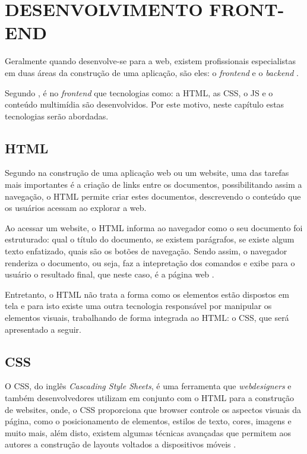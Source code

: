 \section{DESENVOLVIMENTO FRONT-END}

Geralmente quando desenvolve-se para a web, existem profissionais especialistas
em duas áreas da construção de uma aplicação, são eles: o \textit{frontend} e o
\textit{backend} \cite{artigoAvaliacaoEReducaoDoTempoDeRespostaDeSistemasWeb}.

Segundo , é no
\textit{frontend} que tecnologias como: a \ac{HTML}, as \ac{CSS}, o \ac{JS}
e o conteúdo multimídia são desenvolvidos. Por este motivo, neste capítulo estas
tecnologias serão abordadas.

\subsection{HTML}

Segundo  na construção de uma aplicação web ou
um website, uma das tarefas mais importantes é a criação de links entre os
documentos, possibilitando assim a navegação, o \acs{HTML} permite criar
estes documentos, descrevendo o conteúdo que os usuários acessam ao explorar a
web.

Ao acessar um website, o \acs{HTML} informa ao navegador como o seu documento
foi estruturado: qual o título do documento, se existem parágrafos, se existe
algum texto enfatizado, quais são os botões de navegação. Sendo assim, o
navegador renderiza o documento, ou seja, faz a intepretação dos
comandos e exibe para o usuário o resultado final, que neste caso, é a página
web \cite{headFirstHTMLWithCSSAndXHTML}.

Entretanto, o \acs{HTML} não trata a forma como os elementos estão dispostos em
tela e para isto existe uma outra tecnologia responsável por manipular os
elementos visuais, trabalhando de forma integrada ao \acs{HTML}:
o \acs{CSS}, que será apresentado a seguir.

\subsection{CSS}

O \ac{CSS}, do inglês \textit{Cascading Style Sheets}, é uma ferramenta
que \textit{webdesigners} e também desenvolvedores utilizam em conjunto com o
\ac{HTML} para a construção de websites, onde, o \acs{CSS} proporciona que \ac{browser}
controle os aspectos visuais da página, como o posicionamento de elementos,
estilos de texto, cores, imagens e muito mais, além disto, existem algumas
técnicas avançadas que permitem aos autores a construção de layouts voltados a
dispositivos móveis \cite{beginningCSSCascadingStyleSheetsForWebDesign}.

